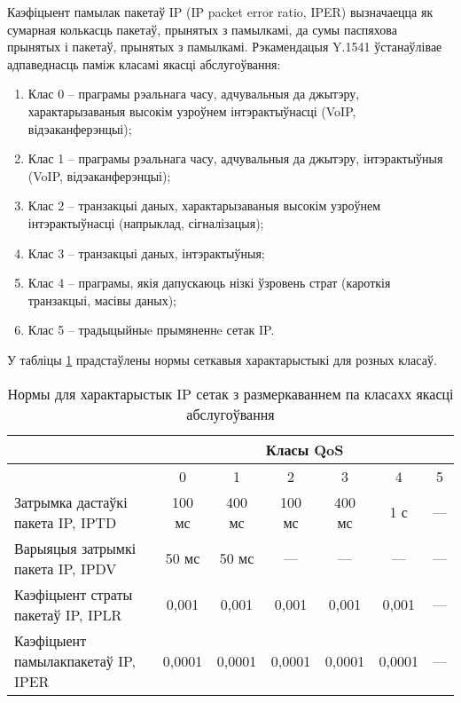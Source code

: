 Каэфіцыент памылак пакетаў IP (IP packet error ratio, IPER) вызначаецца як сумарная колькасць пакетаў, прынятых з памылкамі, да сумы паспяхова прынятых і пакетаў, прынятых з памылкамі.
Рэкамендацыя Y.1541 ўстанаўлівае адпаведнасць паміж класамі якасці абслугоўвання:
\begin{enumerate}
    \item Клас 0 -- праграмы рэальнага часу, адчувальныя да джытэру, характарызаваныя высокім узроўнем інтэрактыўнасці (VoIP, відэаканферэнцыі);
    \item Клас 1 -- праграмы рэальнага часу, адчувальныя да джытэру, інтэрактыўныя (VoIP, відэаканферэнцыі);
    \item Клас 2 -- транзакцыі даных, характарызаваныя высокім узроўнем інтэрактыўнасці (напрыклад, сігналізацыя);
    \item Клас 3 -- транзакцыі даных, інтэрактыўныя;
    \item Клас 4 -- праграмы, якія дапускаюць нізкі ўзровень страт (кароткія транзакцыі, масівы даных);
    \item Клас 5 -- традыцыйныe прымяненнe сетак IP.
\end{enumerate}

\newpage

У табліцы \ref{table: Class Charactaristics} прадстаўлены нормы сеткавыя характарыстыкі для розных класаў.

\begin{table}[h!]
    \caption{Нормы для характарыстык IP сетак з
             размеркаваннем па класахх якасці абслугоўвання}
    \begin{tabularx}{\textwidth}{|>{\centering\arraybackslash}X|
                                 c|c|c|c|c|c|}
        \hline
        \multirow{2}{*}{Сеткавыя характарыстыкі} & \multicolumn{6}{c|}{Класы QoS} \\
        \cline{2-7}
                  & 0 & 1 & 2 & 3 & 4 & 5 \\
        \hline
        Затрымка дастаўкі пакета IP, IPTD & 100 мс & 400 мс & 100 мс & 400 мс & 1 с & ---  \\
        \hline
        Варыяцыя затрымкі пакета IP, IPDV & 50 мс & 50 мс & --- & --- & --- & --- \\
        \hline
        Каэфіцыент страты пакетаў IP, IPLR & 0,001 & 0,001 & 0,001 & 0,001 & 0,001 & --- \\
        \hline
        Каэфіцыент памылакпакетаў IP, IPER & 0,0001 & 0,0001 & 0,0001 & 0,0001 & 0,0001 & --- \\
        \hline
    \end{tabularx}
    \label{table: Class Charactaristics}
\end{table}

